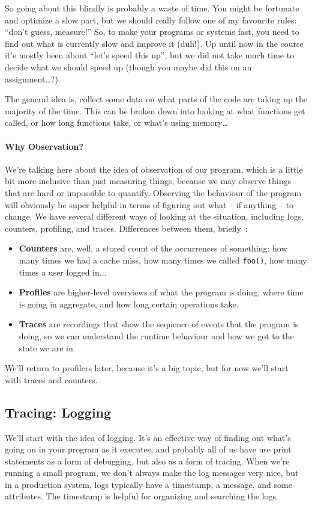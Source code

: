 \documentclass[a4paper]{report}
\begin{document}
So going about this blindly is probably a waste of time. You might be fortunate and optimize a slow part, but we should really follow one of my favourite rules: ``don't guess, measure!'' So, to make your programs or systems fast, you need to find out what is currently slow and improve it (duh!). Up until now in the course it's mostly been about ``let's speed this up'', but we did not take much time to decide what we should speed up (though you maybe did this on an assignment\ldots?).

The general idea is, collect some data on what parts of the code are taking up the majority of the time. This can be broken down into looking at what functions get called, or how long functions take, or what's using memory\ldots

\paragraph{Why Observation?} We're talking here about the idea of observation of our program, which is a little bit more inclusive than just measuring things, because we may observe things that are hard or impossible to quantify. Observing the behaviour of the program will obviously be super helpful in terms of figuring out what -- if anything -- to change. We have several different ways of looking at the situation, including logs, counters, profiling, and traces. Differences between them, briefly~\cite{usd}:

\begin{itemize}
	\item \textbf{Counters} are, well, a stored count of the occurrences of something: how many times we had a cache miss, how many times we called \texttt{foo()}, how many times a user logged in...
	\item \textbf{Profiles} are higher-level overviews of what the program is doing, where time is going in aggregate, and how long certain operations take.
	\item \textbf{Traces} are recordings that show the sequence of events that the program is doing, so we can understand the runtime behaviour and how we got to the state we are in.
\end{itemize}

We'll return to profilers later, because it's a big topic, but for now we'll start with traces and counters.

\subsection*{Tracing: Logging}
We'll start with the idea of logging. It's an effective way of finding out what's going on in your program as it executes, and probably all of us have use print statements as a form of debugging, but also as a form of tracing. When we're running a small program, we don't always make the log messages very nice, but in a production system, logs typically have a timestamp, a message, and some attributes. The timestamp is helpful for organizing and searching the logs. 
\end{document}
